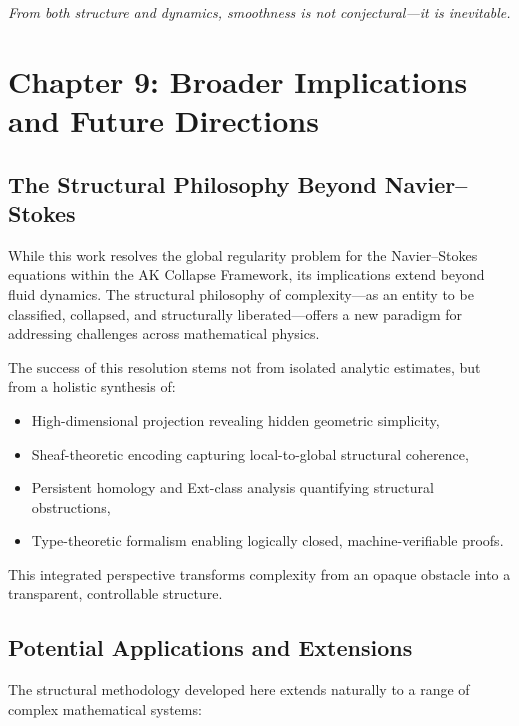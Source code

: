 \documentclass[11pt]{article}
\begin{document}
\begin{center}
\emph{From both structure and dynamics, smoothness is not conjectural---it is inevitable.}
\end{center}



\section{Chapter 9: Broader Implications and Future Directions}

\subsection{The Structural Philosophy Beyond Navier--Stokes}

While this work resolves the global regularity problem for the Navier--Stokes equations within the AK Collapse Framework, its implications extend beyond fluid dynamics. The structural philosophy of complexity---as an entity to be classified, collapsed, and structurally liberated---offers a new paradigm for addressing challenges across mathematical physics.

The success of this resolution stems not from isolated analytic estimates, but from a holistic synthesis of:
\begin{itemize}
  \item High-dimensional projection revealing hidden geometric simplicity,
  \item Sheaf-theoretic encoding capturing local-to-global structural coherence,
  \item Persistent homology and Ext-class analysis quantifying structural obstructions,
  \item Type-theoretic formalism enabling logically closed, machine-verifiable proofs.
\end{itemize}

This integrated perspective transforms complexity from an opaque obstacle into a transparent, controllable structure.

\subsection{Potential Applications and Extensions}

The structural methodology developed here extends naturally to a range of complex mathematical systems:
\end{document}
